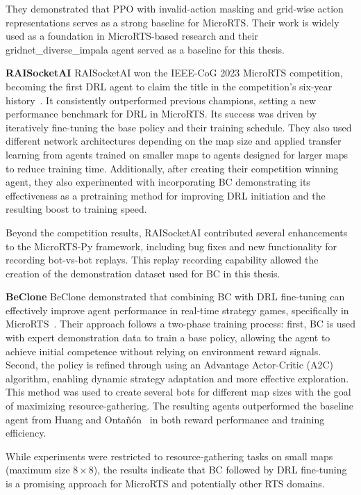 \documentclass[10pt,twocolumn,letterpaper]{article}
\begin{document}
They demonstrated that PPO with invalid-action masking and grid-wise action representations serves as a strong baseline for MicroRTS. Their work is widely used as a foundation in MicroRTS-based research and their  gridnet\_diverse\_impala  agent served as a baseline for this thesis.


\vspace{10pt}


\noindent\textbf{RAISocketAI}
RAISocketAI won the IEEE-CoG 2023 MicroRTS competition, becoming the first DRL agent to claim the title in the competition’s six-year history~\cite{goodfriend2024raisocketai}. It consistently outperformed previous champions, setting a new performance benchmark for DRL in MicroRTS. Its success was driven by iteratively fine-tuning the base policy and their training schedule. They also used different network architectures depending on the map size and applied transfer learning from agents trained on smaller maps to agents designed for larger maps to reduce training time. Additionally, after creating their competition winning agent, they also experimented with incorporating BC demonstrating its effectiveness as a pretraining method for improving DRL initiation and the resulting  boost to training speed.

Beyond the competition results, RAISocketAI contributed several enhancements to the MicroRTS-Py framework, including bug fixes and new functionality for recording bot-vs-bot replays. This replay recording capability allowed the creation of the demonstration dataset used for BC in this thesis.
\vspace{10pt}

\noindent\textbf{BeClone}
BeClone demonstrated that combining BC with DRL fine-tuning can effectively improve agent performance in real-time strategy games, specifically in MicroRTS~\cite{martin2021beclone}. Their approach follows a two-phase training process: first, BC is used with expert demonstration data to train a base policy, allowing the agent to achieve initial competence without relying on environment reward signals. Second, the policy is refined through using an Advantage Actor-Critic (A2C) algorithm, enabling dynamic strategy adaptation and more effective exploration. This method was used to create several bots for different map sizes with the goal of maximizing resource-gathering. The resulting agents outperformed the baseline agent from Huang and Ontañón~\cite{huang2021gym} in both reward performance and training efficiency.

While experiments were restricted to resource-gathering tasks on small maps (maximum size $8 \times 8$), the results indicate that BC followed by DRL fine-tuning is a promising approach for MicroRTS and potentially other RTS domains.
\vspace{10pt}
\end{document}

